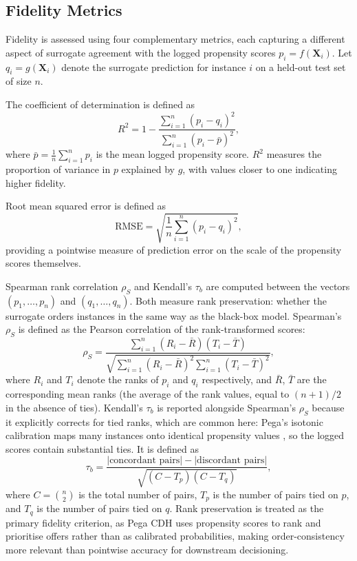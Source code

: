 \documentclass[oneside]{memoir} %
\begin{document}
\subsection{Fidelity Metrics}

Fidelity is assessed using four complementary metrics, each capturing a different aspect of surrogate agreement with the logged propensity scores $p_i = f(\mathbf{X}_i)$. Let $q_i = g(\mathbf{X}_i)$ denote the surrogate prediction for instance $i$ on a held-out test set of size $n$.

The coefficient of determination is defined as
\[
R^2 = 1 - \frac{\sum_{i=1}^{n}(p_i - q_i)^2}{\sum_{i=1}^{n}(p_i - \bar{p})^2},
\]
where $\bar{p} = \frac{1}{n}\sum_{i=1}^{n} p_i$ is the mean logged propensity score. $R^2$ measures the proportion of variance in $p$ explained by $g$, with values closer to one indicating higher fidelity.

Root mean squared error is defined as
\[
\text{RMSE} = \sqrt{\frac{1}{n}\sum_{i=1}^{n}(p_i - q_i)^2},
\]
providing a pointwise measure of prediction error on the scale of the propensity scores themselves.

Spearman rank correlation $\rho_S$ and Kendall's $\tau_b$ are computed between the vectors $(p_1, \ldots, p_n)$ and $(q_1, \ldots, q_n)$. Both measure rank preservation: whether the surrogate orders instances in the same way as the black-box model. Spearman's $\rho_S$ is defined as the Pearson correlation of the rank-transformed scores:
\[
\rho_S = \frac{\sum_{i=1}^{n}(R_i - \bar{R})(T_i - \bar{T})} {\sqrt{\sum_{i=1}^{n}(R_i - \bar{R})^2 \sum_{i=1}^{n}(T_i - \bar{T})^2}},
\]
where $R_i$ and $T_i$ denote the ranks of $p_i$ and $q_i$ respectively, and $\bar{R}$, $\bar{T}$ are the corresponding mean ranks (the average of the rank values, equal to $(n+1)/2$ in the absence of ties). Kendall's $\tau_b$ is reported alongside Spearman's $\rho_S$ because it explicitly corrects for tied ranks, which are common here: Pega's isotonic calibration maps many instances onto identical propensity values \parencite{pegasystems_adm_2026}, so the logged scores contain substantial ties. It is defined as
\[
\tau_b = \frac{|\text{concordant pairs}| - |\text{discordant pairs}|} {\sqrt{(C - T_p)(C - T_q)}},
\]
where $C = \binom{n}{2}$ is the total number of pairs, $T_p$ is the number of pairs tied on $p$, and $T_q$ is the number of pairs tied on $q$. Rank preservation is treated as the primary fidelity criterion, as Pega CDH uses propensity scores to rank and prioritise offers rather than as calibrated probabilities, making order-consistency more relevant than pointwise accuracy for downstream decisioning.
\end{document}

